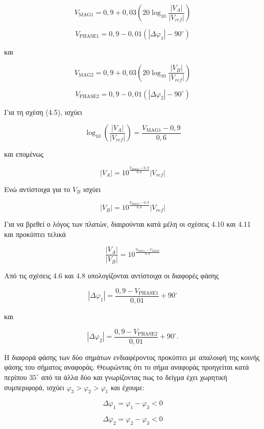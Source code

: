 \[
V_{\mathrm{MAG}1}=0{,}9+0{,}03\left(20\log_{10}
\frac{\left|V_{A}\right|}{\left|V_{ref}\right|}\right)
\tag{4.5}\]

\[
V_{\mathrm{PHASE}1}
=
0{,}9
-
0{,}01
\left(
\left|\Delta\varphi_{1}\right|
-
90^{\circ}
\right)
\tag{4.6}
\]

και

\[
V_{\mathrm{MAG}2}=0{,}9+0{,}03\left(20\log_{10}
\frac{\left|V_{B}\right|}{\left|V_{ref}\right|}\right)
\tag{4.7}
\]

\[
V_{\mathrm{PHASE}2}
=
0,9
-
0,01
\left(
\left|\Delta\varphi_{2}\right|
-
90^{\circ}
\right)
\tag{4.8}
\]

Για τη σχέση (4.5), ισχύει

\[
\log_{10}\left(\frac{\left|V_{A}\right|}{\left|V_{ref}\right|}\right)
=\frac{V_{\mathrm{MAG}1}-0{,}9}{0{,}6}
\tag{4.9}\]

και επομένως

\[
\left|V_{A}\right|=
10^{\frac{V_{\mathrm{MAG}1}-0{,}9}{0{,}6}}\left|V_{ref}\right|
\tag{4.10}
\]

Ενώ αντίστοιχα για το \(V_{B}\) ισχύει

\[
\left|V_{B}\right|=
10^{\frac{V_{\mathrm{MAG}2}-0{,}9}{0{,}6}}\left|V_{ref}\right|
\tag{4.11}
\]

Για να βρεθεί ο λόγος των πλατών, διαιρούνται κατά μέλη οι σχέσεις 4.10
και 4.11 και προκύπτει τελικά

\[
\frac{\left|V_{A}\right|}{\left|V_{B}\right|}
=10^{\frac{V_{\mathrm{MAG}1}-V_{\mathrm{MAG}2}}{0{,}6}}
\tag{4.12}
\]

Από τις σχέσεις 4.6 και 4.8 υπολογίζονται αντίστοιχα οι διαφορές φάσης

\[
\left|\Delta\varphi_{1}\right|
=\frac{0{,}9-V_{\mathrm{PHASE}1}}{0{,}01}+90^{\circ}
\tag{4.13}
\]

και

\[
\left|\Delta\varphi_{2}\right|
=\frac{0{,}9-V_{\mathrm{PHASE}2}}{0{,}01}+90^{\circ}.
\tag{4.14}
\]

Η διαφορά φάσης των δύο σημάτων ενδιαφέροντος προκύπτει με απαλοιφή της κοινής φάσης του σήματος αναφοράς. Θεωρώντας ότι το σήμα αναφοράς προηγείται κατά περίπου \(35^\circ\) από τα άλλα δύο και γνωρίζοντας πως το δείγμα έχει χωρητική συμπεριφορά, ισχύει \(\varphi_3 > \varphi_2 > \varphi_1\) και έχουμε:

\[
\Delta\varphi_1 = \varphi_1 - \varphi_3 < 0
\tag{4.15}\]

\[
\Delta\varphi_2 = \varphi_2 - \varphi_3 < 0
\tag{4.16}\]

